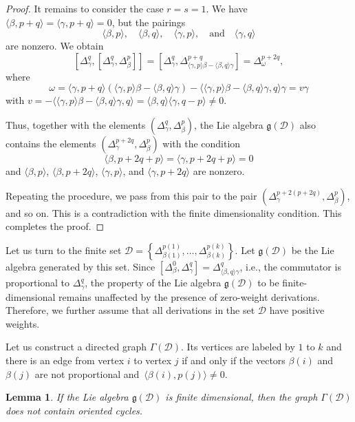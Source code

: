\documentclass[a4paper, 12pt,oneside,reqno]{amsart}
\numberwithin{equation}{section}
\newtheorem{lemma}[theorem]{Lemma}
\theoremstyle{definition}
\begin{document}
\begin{proof}
It remains to consider the case $r=s=1$. We have $\langle\beta,p+q\rangle=\langle\gamma,p+q\rangle=0$, but the pairings 
$$
\langle\beta,p\rangle, \quad \langle\beta,q\rangle, \quad \langle\gamma,p\rangle, \quad \text{and} \quad \langle\gamma,q\rangle 
$$
are nonzero. We obtain
$$
[\Delta^q_{\gamma},[\Delta^q_{\gamma}, \Delta^p_{\beta}]]=[\Delta^q_{\gamma},\Delta^{p+q}_{\langle\gamma,p\rangle\beta-\langle\beta,q\rangle\gamma}]= 
\Delta^{p+2q}_{\omega},
$$
where
$$
\omega=\langle\gamma,p+q\rangle(\langle\gamma,p\rangle\beta-\langle\beta,q\rangle\gamma)-\langle\langle\gamma,p\rangle\beta-\langle\beta,q\rangle\gamma,q\rangle\gamma=v\gamma
$$
with $v=-\langle\langle\gamma,p\rangle\beta-\langle\beta,q\rangle\gamma,q\rangle=\langle\beta,q\rangle\langle\gamma,q-p\rangle\ne 0.$ 

Thus, together with the elements $(\Delta^q_{\gamma}, \Delta^p_{\beta})$, the Lie algebra $\mathfrak{g}(\mathcal{D})$ also contains the elements $(\Delta^{p+2q}_{\gamma}, \Delta^p_{\beta})$ with the condition
$$
\langle\beta,p+2q+p\rangle=\langle\gamma,p+2q+p\rangle=0
$$ 
and $\langle\beta,p\rangle$, $\langle\beta,p+2q\rangle$, $\langle\gamma,p\rangle$, and $\langle\gamma,p+2q\rangle$ are nonzero. 

Repeating the procedure, we pass from this pair to the pair $(\Delta^{p+2(p+2q)}_{\gamma}, \Delta^p_{\beta})$, and so on. This is a contradiction with the finite dimensionality condition. This completes the proof.
\end{proof}

Let us turn to the finite set $\mathcal{D}=\left\{\Delta^{p(1)}_{\beta(1)},\ldots,\Delta^{p(k)}_{\beta(k)}\right\}$. Let $\mathfrak{g}(\mathcal{D})$ be the Lie algebra generated by this set.
Since $[\Delta^0_{\beta},\Delta^q_{\gamma}] = \Delta^q_{\langle\beta,q\rangle\gamma}$, i.e., the commutator is proportional to $\Delta^q_{\gamma}$, the property of the Lie algebra $\mathfrak{g}(\mathcal{D})$ to be finite-dimensional remains unaffected by the presence of zero-weight derivations.  Therefore, we further assume that all derivations in the set $\mathcal{D}$ have positive weights.

Let us construct a directed graph $\Gamma(\mathcal{D})$. Its vertices are labeled by $1$ to $k$ and there is an edge from vertex $i$  to vertex $j$ if and only if the vectors $\beta(i)$ and $\beta(j)$ are not proportional and~$\langle\beta(i),p(j)\rangle\ne 0$.

\begin{lemma}\label{l5}
If the Lie algebra $\mathfrak{g}(\mathcal{D})$ is finite dimensional, then the graph $\Gamma(\mathcal{D})$ does not contain oriented cycles. 
\end{lemma}
\end{document}
